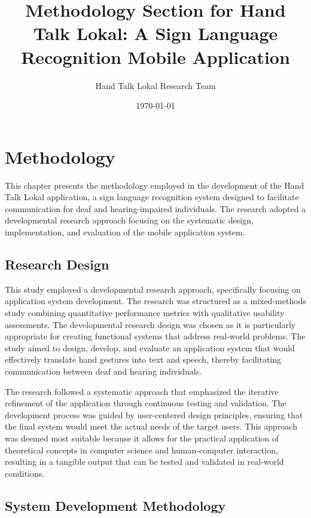 \documentclass[12pt]{article}
\title{Methodology Section for Hand Talk Lokal: A Sign Language Recognition Mobile Application}
\author{Hand Talk Lokal Research Team}
\date{\today}
\begin{document}
\maketitle

\doublespacing

\section{Methodology}

This chapter presents the methodology employed in the development of the Hand Talk Lokal application, a sign language recognition system designed to facilitate communication for deaf and hearing-impaired individuals. The research adopted a developmental research approach focusing on the systematic design, implementation, and evaluation of the mobile application system.

\subsection{Research Design}

This study employed a developmental research approach, specifically focusing on application system development. The research was structured as a mixed-methods study combining quantitative performance metrics with qualitative usability assessments. The developmental research design was chosen as it is particularly appropriate for creating functional systems that address real-world problems. The study aimed to design, develop, and evaluate an application system that would effectively translate hand gestures into text and speech, thereby facilitating communication between deaf and hearing individuals.

The research followed a systematic approach that emphasized the iterative refinement of the application through continuous testing and validation. The development process was guided by user-centered design principles, ensuring that the final system would meet the actual needs of the target users. This approach was deemed most suitable because it allows for the practical application of theoretical concepts in computer science and human-computer interaction, resulting in a tangible output that can be tested and validated in real-world conditions.

\subsection{System Development Methodology}
\end{document}
